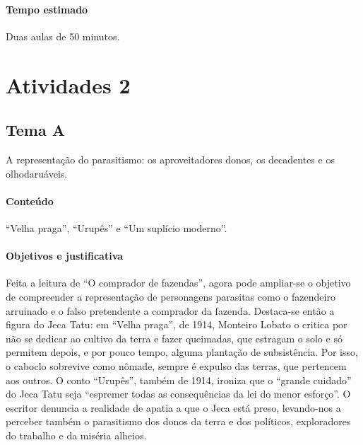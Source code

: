 \documentclass[11pt]{extarticle}
\begin{document}
\paragraph{Tempo estimado} Duas aulas de 50 minutos.


\section{Atividades 2}

\subsection{Tema A}

A representação do parasitismo: os aproveitadores donos, os decadentes e
os olhodaruáveis.


\paragraph{Conteúdo} ``Velha praga'', ``Urupês'' e ``Um suplício moderno''.

\paragraph{Objetivos e justificativa}
Feita a leitura de ``O comprador de fazendas'', agora pode ampliar-se o
objetivo de compreender a representação de personagens parasitas como o
fazendeiro arruinado e o falso pretendente a comprador da fazenda.
Destaca-se então a figura do Jeca Tatu: em ``Velha praga'', de 1914,
Monteiro Lobato o critica por não se dedicar ao cultivo da terra e fazer
queimadas, que estragam o solo e só permitem depois, e por pouco tempo,
alguma plantação de subsistência. Por isso, o caboclo sobrevive como
nômade, sempre é expulso das terras, que pertencem aos outros. O conto
``Urupês'', também de 1914, ironiza que o ``grande cuidado'' do Jeca
Tatu seja ``espremer todas as consequências da lei do menor esforço''. O
escritor denuncia a realidade de apatia a que o Jeca está preso,
levando-nos a perceber também o parasitismo dos donos da terra e dos
políticos, exploradores do trabalho e da miséria alheios.

\end{document}
